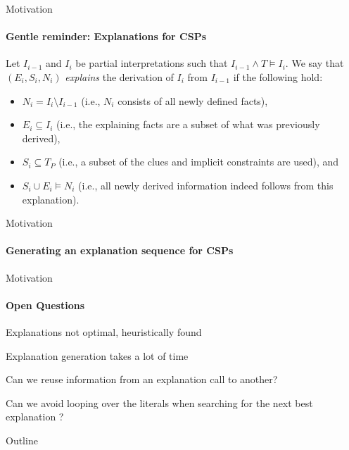 \documentclass{beamer}
\begin{document}
\begin{frame}{Motivation}
	\framesubtitle{Gentle reminder: Explanations for CSPs}
	 \begin{definition}
		Let $I_{i-1}$ and $I_i$ be partial interpretations such that $I_{i-1}\wedge T \models I_i$.
		We say that $(E_i,S_i,N_i)$ \emph{explains} the derivation of $I_{i}$ from $I_{i-1}$ if the following hold:
		\begin{itemize}
			\item $N_i= I_i \setminus I_{i-1}$ (i.e., $N_i$ consists of all newly defined facts), 
			\item $E_i\subseteq I_i$ (i.e., the explaining facts are a subset of what was previously derived),
			\item $S_i \subseteq T_P$ (i.e., a subset of the clues and implicit constraints are used), and 
			\item $S_i \cup E_i \models N_i$ (i.e., all newly derived information indeed follows from this explanation).
		\end{itemize}
	\end{definition}
\end{frame}

\begin{frame}{Motivation}
	\framesubtitle{Generating an explanation sequence for CSPs}
	
\end{frame}

\begin{frame}{Motivation}
	\framesubtitle{Open Questions}

   \begin{description}[font=\color{vuborange}\itshape]
	\item[\hspace{0.9cm}Optimality] Explanations not optimal, heuristically found
	\item[\hspace{1.05cm}Efficiency] Explanation generation takes a lot of time
	\item[\hspace{0.3cm}Incrementality] Can we reuse information from an explanation call to another?
	\item[Constrainedness] Can we avoid looping over the literals when searching for the next best explanation ?
   \end{description}
\end{frame}

\begin{frame}{Outline}

\end{frame}
\end{document}

